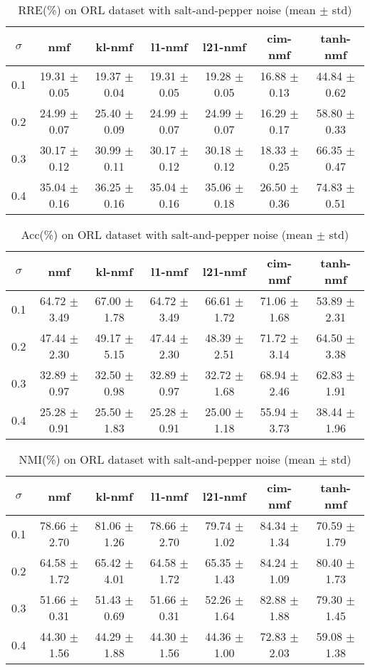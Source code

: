 \documentclass{article} %
\begin{document}
\begin{table}
\begin{tabular}{c|cccccc}$\sigma$ & nmf & kl-nmf & l1-nmf & l21-nmf & cim-nmf & tanh-nmf \\\hline
0.1 & 19.31 $\pm$ 0.05 & 19.37 $\pm$ 0.04 & 19.31 $\pm$ 0.05 & 19.28 $\pm$ 0.05 & 16.88 $\pm$ 0.13 & 44.84 $\pm$ 0.62 \\
0.2 & 24.99 $\pm$ 0.07 & 25.40 $\pm$ 0.09 & 24.99 $\pm$ 0.07 & 24.99 $\pm$ 0.07 & 16.29 $\pm$ 0.17 & 58.80 $\pm$ 0.33 \\
0.3 & 30.17 $\pm$ 0.12 & 30.99 $\pm$ 0.11 & 30.17 $\pm$ 0.12 & 30.18 $\pm$ 0.12 & 18.33 $\pm$ 0.25 & 66.35 $\pm$ 0.47 \\
0.4 & 35.04 $\pm$ 0.16 & 36.25 $\pm$ 0.16 & 35.04 $\pm$ 0.16 & 35.06 $\pm$ 0.18 & 26.50 $\pm$ 0.36 & 74.83 $\pm$ 0.51 \\
\end{tabular}\caption{
  RRE(\%) on ORL dataset with salt-and-pepper noise (mean $\pm$ std)
  \label{tab:RRE-ORL-salt-and-pepper}
}\end{table}
\begin{table}
\begin{tabular}{c|cccccc}$\sigma$ & nmf & kl-nmf & l1-nmf & l21-nmf & cim-nmf & tanh-nmf \\\hline
0.1 & 64.72 $\pm$ 3.49 & 67.00 $\pm$ 1.78 & 64.72 $\pm$ 3.49 & 66.61 $\pm$ 1.72 & 71.06 $\pm$ 1.68 & 53.89 $\pm$ 2.31 \\
0.2 & 47.44 $\pm$ 2.30 & 49.17 $\pm$ 5.15 & 47.44 $\pm$ 2.30 & 48.39 $\pm$ 2.51 & 71.72 $\pm$ 3.14 & 64.50 $\pm$ 3.38 \\
0.3 & 32.89 $\pm$ 0.97 & 32.50 $\pm$ 0.98 & 32.89 $\pm$ 0.97 & 32.72 $\pm$ 1.68 & 68.94 $\pm$ 2.46 & 62.83 $\pm$ 1.91 \\
0.4 & 25.28 $\pm$ 0.91 & 25.50 $\pm$ 1.83 & 25.28 $\pm$ 0.91 & 25.00 $\pm$ 1.18 & 55.94 $\pm$ 3.73 & 38.44 $\pm$ 1.96 \\
\end{tabular}\caption{
  Acc(\%) on ORL dataset with salt-and-pepper noise (mean $\pm$ std)
  \label{tab:Acc-ORL-salt-and-pepper}
}\end{table}
\begin{table}
\begin{tabular}{c|cccccc}$\sigma$ & nmf & kl-nmf & l1-nmf & l21-nmf & cim-nmf & tanh-nmf \\\hline
0.1 & 78.66 $\pm$ 2.70 & 81.06 $\pm$ 1.26 & 78.66 $\pm$ 2.70 & 79.74 $\pm$ 1.02 & 84.34 $\pm$ 1.34 & 70.59 $\pm$ 1.79 \\
0.2 & 64.58 $\pm$ 1.72 & 65.42 $\pm$ 4.01 & 64.58 $\pm$ 1.72 & 65.35 $\pm$ 1.43 & 84.24 $\pm$ 1.09 & 80.40 $\pm$ 1.73 \\
0.3 & 51.66 $\pm$ 0.31 & 51.43 $\pm$ 0.69 & 51.66 $\pm$ 0.31 & 52.26 $\pm$ 1.64 & 82.88 $\pm$ 1.88 & 79.30 $\pm$ 1.45 \\
0.4 & 44.30 $\pm$ 1.56 & 44.29 $\pm$ 1.88 & 44.30 $\pm$ 1.56 & 44.36 $\pm$ 1.00 & 72.83 $\pm$ 2.03 & 59.08 $\pm$ 1.38 \\
\end{tabular}\caption{
  NMI(\%) on ORL dataset with salt-and-pepper noise (mean $\pm$ std)
  \label{tab:NMI-ORL-salt-and-pepper}
}\end{table}
\end{document}
